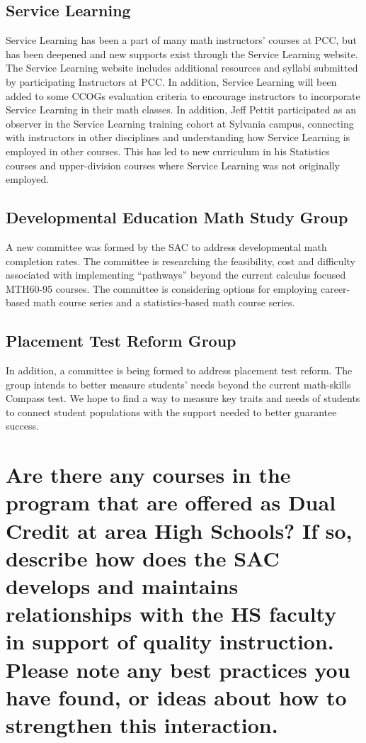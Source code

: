 \subsection{Service Learning}
Service Learning has been a part of many math instructors' courses at PCC, but
has been deepened and new supports exist through the Service Learning website.
The Service Learning website includes additional resources and syllabi submitted
by participating Instructors at PCC. In addition, Service Learning will been
added to some CCOGs evaluation criteria to encourage instructors to incorporate
Service Learning in their math classes. In addition, Jeff Pettit participated as
an observer in the Service Learning training cohort at Sylvania campus,
connecting with instructors in other disciplines and understanding how Service
Learning is employed in other courses. This has led to new curriculum in his
Statistics courses and upper-division courses where Service Learning was not
originally employed.

\subsection{Developmental Education Math Study Group}
A new committee was formed by the SAC to address developmental math completion
rates. The committee is researching the feasibility, cost and difficulty
associated with implementing ``pathways'' beyond the current calculus focused
MTH60-95 courses. The committee is considering options for employing
career-based math course series and a statistics-based math course series.

\subsection{Placement Test Reform Group}
In addition, a committee is being formed to address placement test reform. The
group intends to better measure students' needs beyond the current math-skills
Compass test. We hope to find a way to measure key traits and needs of students
to connect student populations with the support needed to better guarantee
success.

\section[Present dual credit relationships]{Are there any courses in the program
that are offered as Dual Credit at area High Schools?  If so, describe how does
the SAC develops and maintains relationships with the HS faculty in support of
quality instruction. Please note any best practices you have found, or ideas
about how to strengthen this interaction.  }


